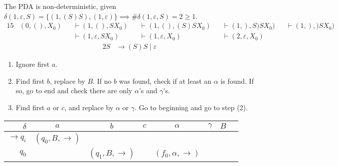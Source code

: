 \documentclass[docid=2017/18]{tcom_exam}
\begin{document}
{\begin{center}
\end{center}
The PDA is non-deterministic, given $\delta(1,\varepsilon,S)=\{(1,(S)S),(1,\varepsilon)\} \implies \#\delta(1,\varepsilon,S)=2 \geq 1$.
\begin{alignat*}{15}
	& (0,(),X_0) && \vdash (1,(),SX_0) && \vdash (1,(),(S)SX_0) && \vdash (1,),S)SX_0) && \vdash (1,),)SX_0) \\
	&            && \vdash (1,\varepsilon,SX_0) && \vdash (1,\varepsilon,X_0) && \vdash (2,\varepsilon,X_0) && 
\end{alignat*}
\begin{alignat*}{2}
	S &\rightarrow (S)S\mid \varepsilon
\end{alignat*}
\begin{enumerate}
	\item Ignore first $a$.
	\item Find first $b$, replace by $B$. If no $b$ was found, check if at least an $\alpha$ is found. If so, go to end and check there are only $\alpha$'s and $\gamma$'s. 
	\item Find first $a$ or $c$, and replace by $\alpha$ or $\gamma$. Go to beginning and go to step (2).
\end{enumerate}
\begin{center}
	\begin{tabular}{r | c c c c c c c }
		$\delta$          & $a$                     & $b$                   & $c$                     & $\alpha$                   & $\gamma$                   & $B$ \\ \hline
		$\rightarrow q_i$ & $(q_0,B,\rightarrow)$   &                       &                         &                            &                            &     \\
		$            q_0$ &                         & $(q_1,B,\rightarrow)$ &                         & $(f_0,\alpha,\rightarrow)$ &                            &     \\

\end{tabular}
\end{center}}
\end{document}
